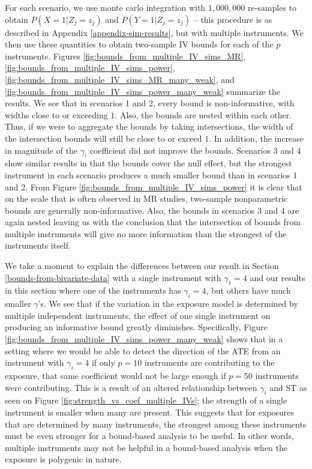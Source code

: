 \documentclass[AMA,STIX1COL,]{WileyNJD-v2}
\begin{document}
For each scenario, we use monte carlo integration with \(1,000,000\)
re-samples to obtain \(P(X = 1 | Z_j = z_j)\) and
\(P(Y = 1 | Z_j = z_j)\) -- this procedure is as described in Appendix
\ref{appendix-sim-results}, but with multiple instruments. We then use
these quantities to obtain two-sample IV bounds for each of the \(p\)
instruments. Figures \ref{fig:bounds_from_multiple_IV_sims_MR},
\ref{fig:bounds_from_multiple_IV_sims_power},
\ref{fig:bounds_from_multiple_IV_sims_MR_many_weak}, and
\ref{fig:bounds_from_multiple_IV_sims_power_many_weak} summarize the
results. We see that in scenarios 1 and 2, every bound is
non-informative, with widths close to or exceeding \(1\). Also, the
bounds are nested within each other. Thus, if we were to aggregate the
bounds by taking intersections, the width of the intersection bounds
will still be close to or exceed \(1\). In addition, the increase in
magnitude of the \(\gamma_i\) coefficient did not improve the bounds.
Scenarios 3 and 4 show similar results in that the bounds cover the null
effect, but the strongest instrument in each scenario produces a much
smaller bound than in scenarios 1 and 2. From Figure
\ref{fig:bounds_from_multiple_IV_sims_power} it is clear that on the
scale that is often observed in MR studies, two-sample nonparametric
bounds are generally non-informative. Also, the bounds in scenarios 3
and 4 are again nested leaving us with the conclusion that the
intersection of bounds from multiple instruments will give no more
information than the strongest of the instruments itself.

We take a moment to explain the differences between our result in
Section \ref{bounds-from-bivariate-data} with a single instrument with
\(\gamma_1 = 4\) and our results in this section where one of the
instruments has \(\gamma_i = 4\), but others have much smaller
\(\gamma\)'s. We see that if the variation in the exposure model is
determined by multiple independent instruments, the effect of one single
instrument on producing an informative bound greatly diminishes.
Specifically, Figure
\ref{fig:bounds_from_multiple_IV_sims_power_many_weak} shows that in a
setting where we would be able to detect the direction of the ATE from
an instrument with \(\gamma_i = 4\) if only \(p = 10\) instruments are
contributing to the exposure, that same coefficient would not be large
enough if \(p = 50\) instruments were contributing. This is a result of
an altered relationship between \(\gamma_i\) and ST as seen on Figure
\ref{fig:strength_vs_coef_multiple_IVs}; the strength of a single
instrument is smaller when many are present. This suggests that for
exposures that are determined by many instruments, the strongest among
these instruments must be even stronger for a bound-based analysis to be
useful. In other words, multiple instruments may not be helpful in a
bound-based analysis when the exposure is polygenic in nature.
\end{document}

